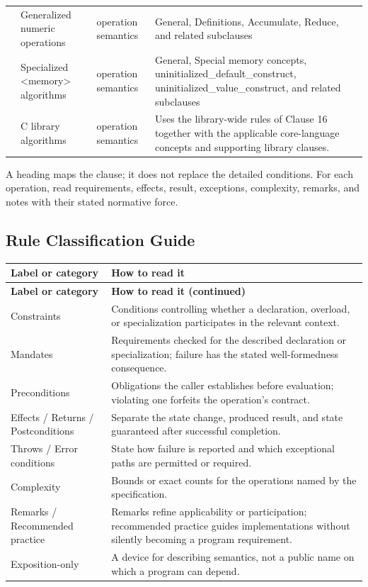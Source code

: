 \documentclass[11pt,letterpaper]{article}
\begin{document}
\begin{longtable}{@{}>{\RaggedRight\arraybackslash}p{}>{\RaggedRight\arraybackslash}p{}>{\RaggedRight\arraybackslash}p{}>{\RaggedRight\arraybackslash}p{}@{}}
27.10 & Generalized numeric operations & operation semantics & General, Definitions, Accumulate, Reduce, and related subclauses\\
27.11 & Specialized <memory> algorithms & operation semantics & General, Special memory concepts, uninitialized\_\allowbreak{}default\_\allowbreak{}construct, uninitialized\_\allowbreak{}value\_\allowbreak{}construct, and related subclauses\\
27.12 & C library algorithms & operation semantics & Uses the library-wide rules of Clause 16 together with the applicable core-language concepts and supporting library clauses.\\
\end{longtable}\normalsize
\begin{CornellReferenceNormativeBox}A heading maps the clause; it does not replace the detailed conditions. For each operation, read requirements, effects, result, exceptions, complexity, remarks, and notes with their stated normative force.\end{CornellReferenceNormativeBox}
\subsection*{Rule Classification Guide}
\small\begin{longtable}{@{}>{\RaggedRight\arraybackslash}p{}>{\RaggedRight\arraybackslash}p{}@{}}\toprule\textbf{Label or category} & \textbf{How to read it}\\\midrule\endfirsthead\toprule\textbf{Label or category} & \textbf{How to read it (continued)}\\\midrule\endhead\bottomrule\endfoot
Constraints & Conditions controlling whether a declaration, overload, or specialization participates in the relevant context.\\
Mandates & Requirements checked for the described declaration or specialization; failure has the stated well-formedness consequence.\\
Preconditions & Obligations the caller establishes before evaluation; violating one forfeits the operation's contract.\\
Effects / Returns / Postconditions & Separate the state change, produced result, and state guaranteed after successful completion.\\
Throws / Error conditions & State how failure is reported and which exceptional paths are permitted or required.\\
Complexity & Bounds or exact counts for the operations named by the specification.\\
Remarks / Recommended practice & Remarks refine applicability or participation; recommended practice guides implementations without silently becoming a program requirement.\\
Exposition-only & A device for describing semantics, not a public name on which a program can depend.\\
\end{longtable}\normalsize
\end{document}
